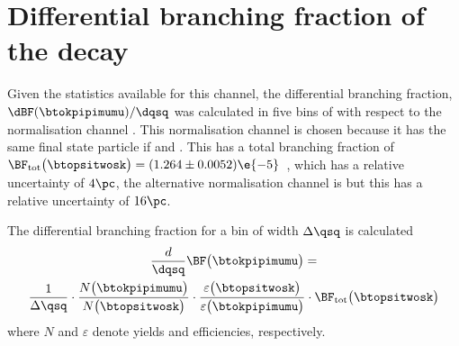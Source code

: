 \section[Differential branching fraction of the decay \btokpipimumu]
{Differential branching fraction of the decay \tmath{\btokpipimumu}}

Given the statistics available for this channel, the differential branching fraction,
$\dBF(\btokpipimumu)/\dqsq$ was calculated in five bins of \qsq with respect to the normalisation
channel \btopsitwosk.
This normalisation channel is chosen because it has the same final state particle if
\psitwostojpsipipi and \jpsitomumu.
This has a total branching fraction of
$\BF_\mathrm{tot}\big(\btopsitwosk\big) = (1.264 \pm 0.0052)\e{-5}$~\cite{PDG2012},
which has a relative uncertainty of $4\pc$, the alternative normalisation channel is
\btojpsikpipi but this has a relative uncertainty of $16\pc$.

The differential branching fraction for a bin of width $\Delta\qsq$ is calculated
\begin{multline}
  \frac{d}{\dqsq}\BF\big(\btokpipimumu\big)=
  \\
  \frac{1}{\Delta\qsq} \cdot
  \frac{N\big(\btokpipimumu\big)}{N\big(\btopsitwosk\big)} \cdot
  \frac{\varepsilon\big(\btopsitwosk\big)}{\varepsilon\big(\btokpipimumu\big)} \cdot
  \BF_\mathrm{tot}\big(\btopsitwosk\big)
  \label{eq:kpipi:diffbf}
\end{multline}
where $N$ and $\varepsilon$ denote yields and efficiencies, respectively.


